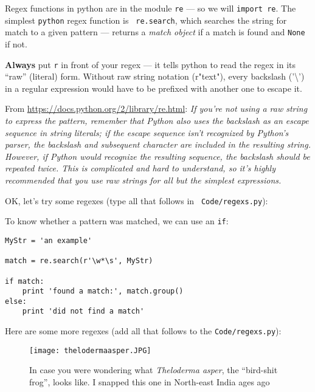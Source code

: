 Regex functions in python are in the module {\tt re} --- so we will 
{\tt import re}. The simplest {\tt python} regex function is {\tt 
re.search}, which searches the string for match to a given pattern --- 
returns a \textit{match object} if a match is found and {\tt None} if 
not. 

\begin{tipbox}
	
{\bf Always} put {\tt r} in front of your regex --- it tells python to 
read the regex in its ``raw'' (literal) form. Without raw string 
notation (r"text"), every backslash ('\textbackslash') in a regular 
expression would have to be prefixed with another one to escape it. 

From \url{https://docs.python.org/2/library/re.html}: {\it If you're 
not using a raw string to express the pattern, remember that Python 
also uses the backslash as an escape sequence in string literals; if 
the escape sequence isn't recognized by Python's parser, the backslash 
and subsequent character are included in the resulting string. However, 
if Python would recognize the resulting sequence, the backslash should 
be repeated twice. This is complicated and hard to understand, so it's 
highly recommended that you use raw strings for all but the simplest 
expressions.}
\end{tipbox}

OK, let's try some regexes (type all that follows in {\tt 
Code/regexs.py}):



 To know whether a pattern was matched, we can use an {\tt if}:

\begin{lstlisting}
MyStr = 'an example'

match = re.search(r'\w*\s', MyStr)

if match:                      
    print 'found a match:', match.group() 
else:
    print 'did not find a match'    
\end{lstlisting}
  
Here are some more regexes (add all that follows to the {\tt Code/regexs.py}):



\begin{figure}[H] \centering
    \texttt{[image: thelodermaasper.JPG]}
\caption{In case you were wondering what {\it Theloderma asper}, the 
``bird-shit frog'', looks like. I snapped this one in North-east India ages 
ago}
\end{figure}

